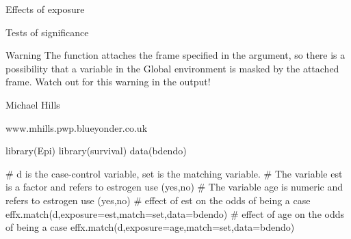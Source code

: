 \begin{Value}
\begin{ldescription}
\item[\code{comp1 }] Effects of exposure
\item[\code{comp2 }] Tests of significance
\end{ldescription}
\end{Value}
\begin{Section}{Warning}
The function attaches the frame specified in the
 argument, so there is a possibility that a variable in the
Global environment is masked by the attached frame. Watch out for this
warning in the output!
\end{Section}
\begin{Author}\relax
Michael Hills
\end{Author}
\begin{References}\relax
www.mhills.pwp.blueyonder.co.uk
\end{References}
\begin{Examples}
\begin{ExampleCode}
library(Epi)
library(survival)
data(bdendo)

# d is the case-control variable, set is the matching variable.
# The variable est is a factor and refers to estrogen use (yes,no)
# The variable age is numeric and refers to estrogen use (yes,no)
# effect of est on the odds of being a case
effx.match(d,exposure=est,match=set,data=bdendo)
# effect of age on the odds of being a case
effx.match(d,exposure=age,match=set,data=bdendo)
\end{ExampleCode}
\end{Examples}

